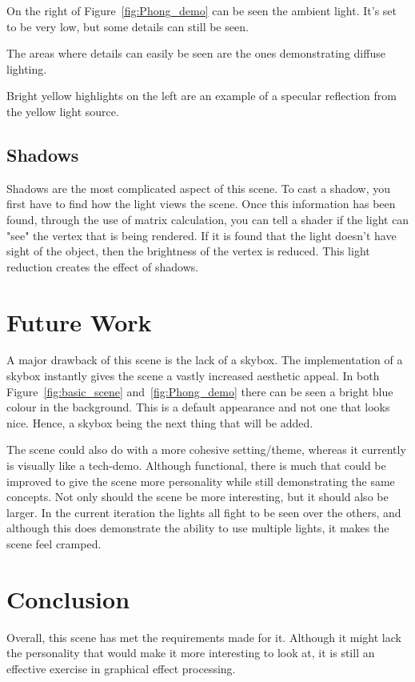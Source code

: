 \documentclass[10pt, a4paper]{article}
\begin{document}
	On the right of Figure~\ref{fig:Phong_demo} can be seen the ambient light.  It's set to be very low, but some details can still be seen.
	
	The areas where details can easily be seen are the ones demonstrating diffuse lighting.
	
	Bright yellow highlights on the left are an example of a specular reflection from the yellow light source.
	\subsection{Shadows}
	Shadows are the most complicated aspect of this scene.  To cast a shadow, you first have to find how the light views the scene.  Once this information has been found, through the use of matrix calculation, you can tell a shader if the light can "see" the vertex that is being rendered.  If it is found that the light doesn't have sight of the object, then the brightness of the vertex is reduced.  This light reduction creates the effect of shadows.
	
	\section{Future Work}
	A major drawback of this scene is the lack of a skybox.  The implementation of a skybox instantly gives the scene a vastly increased aesthetic appeal.  In both Figure~\ref{fig:basic_scene} and~\ref{fig:Phong_demo} there can be seen a bright blue colour in the background.  This is a default appearance and not one that looks nice.  Hence, a skybox being the next thing that will be added.
	
	The scene could also do with a more cohesive setting/theme, whereas it currently is visually like a tech-demo.  Although functional, there is much that could be improved to give the scene more personality while still demonstrating the same concepts.  Not only should the scene be more interesting, but it should also be larger.  In the current iteration the lights all fight to be seen over the others, and although this does demonstrate the ability to use multiple lights, it makes the scene feel cramped.
	
	
	\section{Conclusion}	
	Overall, this scene has met the requirements made for it.  Although it might lack the personality that would make it more interesting to look at, it is still an effective exercise in graphical effect processing.  
	
%	
%	
		
\end{document}
